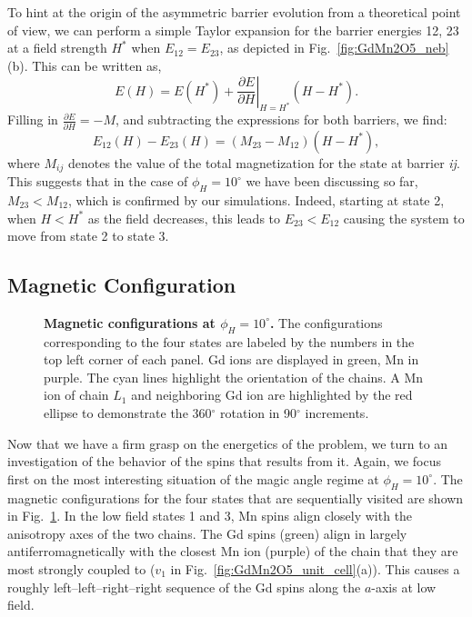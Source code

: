 \\\\
%
To hint at the origin of the asymmetric barrier evolution from a theoretical point of view, we can perform a simple Taylor expansion for the barrier energies 12, 23 at a field strength $H^*$ when $E_{12} = E_{23}$, as depicted in Fig.~\ref{fig:GdMn2O5_neb}(b).
This can be written as,
\begin{equation}
	E(H) = E(H^*) + \left.\frac{\partial E}{\partial H}\right|_{H=H^*}(H - H^*).
\end{equation}
Filling in $\frac{\partial E}{\partial H} = -M$, and subtracting the expressions for both barriers, we find:
\begin{equation}
	E_{12}(H) - E_{23}(H) = (M_{23} - M_{12})(H - H^*),
\end{equation}
where $M_{ij}$ denotes the value of the total magnetization for the state at barrier {\it ij}.
This suggests that in the case of $\phi_H=10^\circ$ we have been discussing so far, $M_{23} < M_{12}$, which is confirmed by our simulations.
Indeed, starting at state 2, when $H<H^*$ as the field decreases, this leads to $E_{23} < E_{12}$ causing the system to move from state 2 to state 3.

\subsection{Magnetic Configuration \label{sec:GdMn2O5_magnetic_configuration}}
\begin{figure}[h!]
    \centering
    \caption{\label{fig:GdMn2O5_spin_configs}{\bf Magnetic configurations at $\phi_H =  10^\circ$.} The configurations corresponding to the four states are labeled by the numbers in the top left corner of each panel. Gd ions are displayed in green, Mn in purple. The cyan lines highlight the orientation of the chains. A Mn ion of chain $L_1$ and neighboring Gd ion are highlighted by the red ellipse to demonstrate the 360$^\circ$ rotation in 90$^\circ$ increments.  }
    \label{fig:GdMn2O5_4configs}
\end{figure}
Now that we have a firm grasp on the energetics of the problem, we turn to an investigation of the behavior of the spins that results from it.
Again, we focus first on the most interesting situation of the magic angle regime at $\phi_H=10^\circ$.
The magnetic configurations for the four states that are sequentially visited are shown in Fig.~\ref{fig:GdMn2O5_4configs}.
In the low field states 1 and 3, Mn spins align closely with the anisotropy axes of the two chains.
The Gd spins (green) align in largely antiferromagnetically with the closest Mn ion (purple) of the chain that they are most strongly coupled to ($v_1$ in Fig.~\ref{fig:GdMn2O5_unit_cell}(a)).
This causes a roughly left--left--right--right sequence of the Gd spins along the $a$-axis at low field. 

